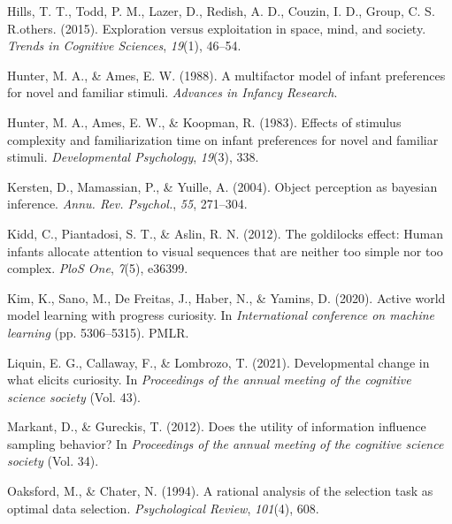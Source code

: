 \documentclass[10pt, letterpaper]{article}
\newenvironment{CSLReferences}%
  {}%
  {\par}
\begin{document}
\begin{CSLReferences}{1}{0}
\leavevmode{}%
Hills, T. T., Todd, P. M., Lazer, D., Redish, A. D., Couzin, I. D.,
Group, C. S. R.others. (2015). Exploration versus exploitation in space,
mind, and society. \emph{Trends in Cognitive Sciences}, \emph{19}(1),
46--54.

\leavevmode{}%
Hunter, M. A., \& Ames, E. W. (1988). A multifactor model of infant
preferences for novel and familiar stimuli. \emph{Advances in Infancy
Research}.

\leavevmode{}%
Hunter, M. A., Ames, E. W., \& Koopman, R. (1983). Effects of stimulus
complexity and familiarization time on infant preferences for novel and
familiar stimuli. \emph{Developmental Psychology}, \emph{19}(3), 338.

\leavevmode{}%
Kersten, D., Mamassian, P., \& Yuille, A. (2004). Object perception as
bayesian inference. \emph{Annu. Rev. Psychol.}, \emph{55}, 271--304.

\leavevmode{}%
Kidd, C., Piantadosi, S. T., \& Aslin, R. N. (2012). The goldilocks
effect: Human infants allocate attention to visual sequences that are
neither too simple nor too complex. \emph{PloS One}, \emph{7}(5),
e36399.

\leavevmode{}%
Kim, K., Sano, M., De Freitas, J., Haber, N., \& Yamins, D. (2020).
Active world model learning with progress curiosity. In
\emph{International conference on machine learning} (pp. 5306--5315).
PMLR.

\leavevmode{}%
Liquin, E. G., Callaway, F., \& Lombrozo, T. (2021). Developmental
change in what elicits curiosity. In \emph{Proceedings of the annual
meeting of the cognitive science society} (Vol. 43).

\leavevmode{}%
Markant, D., \& Gureckis, T. (2012). Does the utility of information
influence sampling behavior? In \emph{Proceedings of the annual meeting
of the cognitive science society} (Vol. 34).

\leavevmode{}%
Oaksford, M., \& Chater, N. (1994). A rational analysis of the selection
task as optimal data selection. \emph{Psychological Review},
\emph{101}(4), 608.


\end{CSLReferences}
\end{document}
